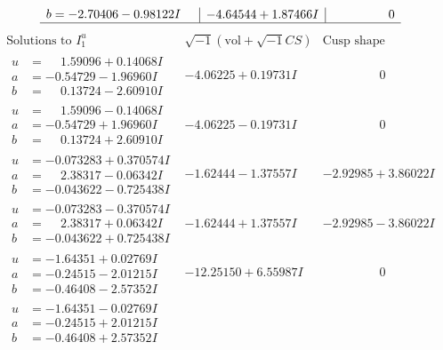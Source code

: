 \documentclass[1p]{elsarticle_modified}
\theoremstyle{definition}
\newcommand{\I}{\sqrt{-1}}
\begin{document}
$$\begin{array}{c|c|c}
\begin{aligned}
b &= -2.70406 - 0.98122 I\end{aligned}
 & -4.64544 + 1.87466 I & \phantom{-0.000000 } 0\\
 \hline 
 \end{array}$$\newpage$$\begin{array}{c|c|c}  
\text{Solutions to }I^u_{1}& \I (\text{vol} + \sqrt{-1}CS) & \text{Cusp shape}\\
 \hline 
\begin{aligned}
u &= \phantom{-}1.59096 + 0.14068 I \\
a &= -0.54729 - 1.96960 I \\
b &= \phantom{-}0.13724 - 2.60910 I\end{aligned}
 & -4.06225 + 0.19731 I & \phantom{-0.000000 } 0 \\ \hline\begin{aligned}
u &= \phantom{-}1.59096 - 0.14068 I \\
a &= -0.54729 + 1.96960 I \\
b &= \phantom{-}0.13724 + 2.60910 I\end{aligned}
 & -4.06225 - 0.19731 I & \phantom{-0.000000 } 0 \\ \hline\begin{aligned}
u &= -0.073283 + 0.370574 I \\
a &= \phantom{-}2.38317 - 0.06342 I \\
b &= -0.043622 - 0.725438 I\end{aligned}
 & -1.62444 - 1.37557 I & -2.92985 + 3.86022 I \\ \hline\begin{aligned}
u &= -0.073283 - 0.370574 I \\
a &= \phantom{-}2.38317 + 0.06342 I \\
b &= -0.043622 + 0.725438 I\end{aligned}
 & -1.62444 + 1.37557 I & -2.92985 - 3.86022 I \\ \hline\begin{aligned}
u &= -1.64351 + 0.02769 I \\
a &= -0.24515 - 2.01215 I \\
b &= -0.46408 - 2.57352 I\end{aligned}
 & -12.25150 + 6.55987 I & \phantom{-0.000000 } 0 \\ \hline\begin{aligned}
u &= -1.64351 - 0.02769 I \\
a &= -0.24515 + 2.01215 I \\
b &= -0.46408 + 2.57352 I\end{aligned}

\end{array}$$
\end{document}
